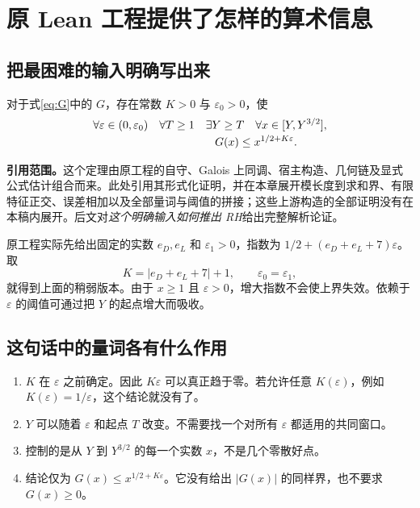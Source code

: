 \chapter{原 Lean 工程提供了怎样的算术信息}
\label{chap:arithmetic}
\section{把最困难的输入明确写出来}
\begin{inputtheorem}
\label{thm:arithmetic}
对于式\eqref{eq:G}中的 $G$，存在常数 $K>0$ 与 $\varepsilon_0>0$，使
\begin{equation}
\begin{split}
&\forall\varepsilon\in(0,\varepsilon_0)\quad\forall T\ge1
\quad\exists Y\ge T\quad\forall x\in[Y,Y^{3/2}],\\[-2pt]
&\hspace{38mm}G(x)\le x^{1/2+K\varepsilon}.
\end{split}
\label{eq:arith-window}
\end{equation}
\end{inputtheorem}

\textbf{引用范围。}这个定理由原工程的自守、Galois 上同调、宿主构造、几何链及显式公式估计组合而来。此处引用其形式化证明，并在本章展开模长度到求和界、有限特征正交、误差相加以及全部量词与阈值的拼接；这些上游构造的全部证明没有在本稿内展开。后文对\emph{这个明确输入如何推出 RH}给出完整解析论证。

原工程实际先给出固定的实数 $e_D,e_L$ 和 $\varepsilon_1>0$，指数为
$1/2+(e_D+e_L+7)\varepsilon$。取
\[
K=|e_D+e_L+7|+1,\qquad \varepsilon_0=\varepsilon_1,
\]
就得到上面的稍弱版本。由于 $x\ge1$ 且 $\varepsilon>0$，增大指数不会使上界失效。依赖于 $\varepsilon$ 的阈值可通过把 $Y$ 的起点增大而吸收。

\section{这句话中的量词各有什么作用}
\begin{enumerate}
\item $K$ 在 $\varepsilon$ 之前确定。因此 $K\varepsilon$ 可以真正趋于零。若允许任意 $K(\varepsilon)$，例如 $K(\varepsilon)=1/\varepsilon$，这个结论就没有了。
\item $Y$ 可以随着 $\varepsilon$ 和起点 $T$ 改变。不需要找一个对所有 $\varepsilon$ 都适用的共同窗口。
\item 控制的是从 $Y$ 到 $Y^{3/2}$ 的每一个实数 $x$，不是几个零散好点。
\item 结论仅为 $G(x)\le x^{1/2+K\varepsilon}$。它没有给出 $|G(x)|$ 的同样界，也不要求 $G(x)\ge0$。
\end{enumerate}

